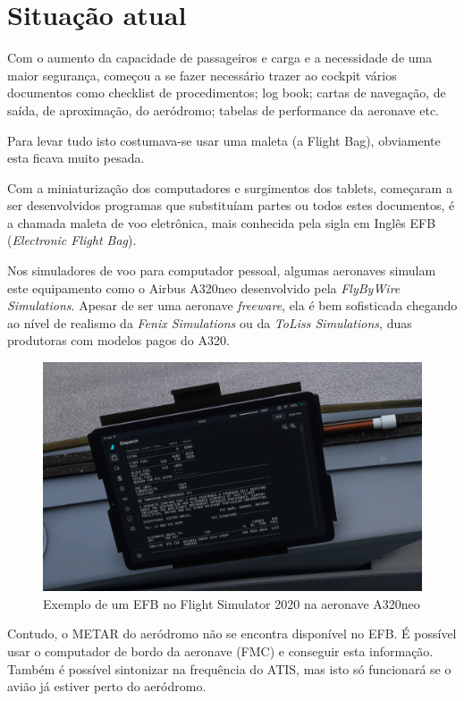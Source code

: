 \chapter{Situação atual}
Com o aumento da capacidade de passageiros e carga e a 
necessidade de uma maior 
segurança, começou a se fazer necessário trazer ao cockpit vários
documentos como checklist de procedimentos; log book; cartas de 
navegação, de saída, de aproximação, do aeródromo; tabelas de 
performance da aeronave etc. 

Para levar tudo isto costumava-se usar uma maleta (a Flight Bag),
obviamente esta ficava muito pesada.

Com a miniaturização dos computadores e surgimentos dos tablets, 
começaram a ser desenvolvidos programas que substituíam partes
ou todos estes documentos, é a chamada maleta de voo eletrônica,
mais conhecida pela sigla em Inglês EFB (\textit{Electronic Flight Bag}).

Nos simuladores de voo para computador pessoal, algumas aeronaves
simulam este equipamento como o Airbus A320neo desenvolvido pela
\textit{FlyByWire Simulations}. Apesar de ser uma aeronave \textit{freeware}, ela 
é bem sofisticada chegando ao nível de realismo da \textit{Fenix Simulations}
ou da \textit{ToLiss Simulations}, duas produtoras com modelos pagos do A320.

\begin{figure}[ht]
    \begin{center}
    \includegraphics[width=400pt]{img/efb-a320.png}
    \caption{Exemplo de um EFB no Flight Simulator 2020 na aeronave A320neo}
    \label{fig:efb-a320}
    \end{center}
\end{figure}

Contudo, o METAR do aeródromo não se encontra disponível no EFB.
É possível usar o computador de bordo da aeronave (FMC) e conseguir
esta informação. Também é possível sintonizar na frequência do ATIS,
mas isto só funcionará se o avião já estiver perto do aeródromo.

